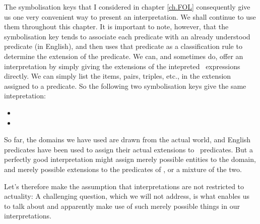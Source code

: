 The symbolisation keys that I considered in chapter \ref{ch.FOL} consequently give us one very convenient way to present an interpretation. We shall continue to use them throughout this chapter. It is important to note, however, that the symbolisation key tends to associate each predicate with an already understood predicate (in English), and then uses that predicate as a classification rule to determine the extension of the predicate. We can, and sometimes do, offer an interpretation by simply giving the extensions of the intepreted \FOL\ expressions directly. We can simply list the items, pairs, triples, etc., in the extension assigned to a predicate. So the following two symbolisation keys give the same intepretation: 
\begin{itemize}
	\item {} 
\item {}
\end{itemize}

So far, the domains we have used are drawn from the actual world, and English predicates have been used to assign their actual extensions to \FOL\ predicates. But a perfectly good interpretation might assign merely possible entities to the domain, and merely possible extensions to the predicates of \FOL, or a mixture of the two. 

Let's therefore make the assumption that interpretations are not restricted to actuality:  A challenging question, which we will not address, is what enables us to talk about and apparently make use of such merely possible things in our interpretations.


